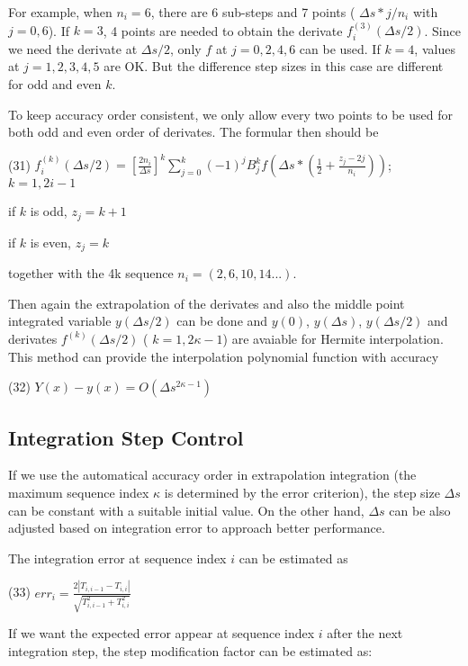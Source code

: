 For example, when $ n_i = 6 $, there are 6 sub-\/steps and 7 points ( $ \Delta s*j/n_i $ with $j=0,6$). If $ k = 3 $, 4 points are needed to obtain the derivate $ f_i^{(3)}(\Delta s/2) $. Since we need the derivate at $ \Delta s/2 $, only $ f $ at $ j = 0,2,4,6 $ can be used. If $ k = 4 $, values at $ j= 1,2,3,4,5$ are OK. But the difference step sizes in this case are different for odd and even $ k$.

To keep accuracy order consistent, we only allow every two points to be used for both odd and even order of derivates. The formular then should be

(31) $ f_i^{(k)}(\Delta s/2) = \left[ \frac{2n_i}{\Delta s} \right]^k \sum_{j=0}^k (-1)^j B_j^k f(\Delta s*(\frac{1}{2}+\frac{z_j-2j}{n_i})) $; $ k=1,2i-1 $
\begin{DoxyItemize}
\item if $k$ is odd, $ z_j = k+1 $
\item if $k$ is even, $ z_j = k $
\end{DoxyItemize}

together with the 4k sequence $ n_i =(2, 6, 10, 14 ...) $.

Then again the extrapolation of the derivates and also the middle point integrated variable $ y(\Delta s/2) $ can be done and $ y(0) $, $ y(\Delta s) $, $ y(\Delta s/2) $ and derivates $ f^{(k)}(\Delta s/2) $ ( $ k =1,2\kappa-1 $) are avaiable for Hermite interpolation. This method can provide the interpolation polynomial function with accuracy

(32) $ Y(x) - y(x) = O(\Delta s^{2\kappa-1}) $\hypertarget{index_step_sec}{}\subsection{Integration Step Control}\label{index_step_sec}
If we use the automatical accuracy order in extrapolation integration (the maximum sequence index $\kappa $ is determined by the error criterion), the step size $\Delta s$ can be constant with a suitable initial value. On the other hand, $ \Delta s$ can be also adjusted based on integration error to approach better performance.

The integration error at sequence index $ i$ can be estimated as

(33) $ err_i = \frac{2|T_{i,i-1} - T_{i,i}|}{\sqrt{T_{i,i-1}^2 + T_{i,i}^2}}$

If we want the expected error appear at sequence index $ i$ after the next integration step, the step modification factor can be estimated as\+:

